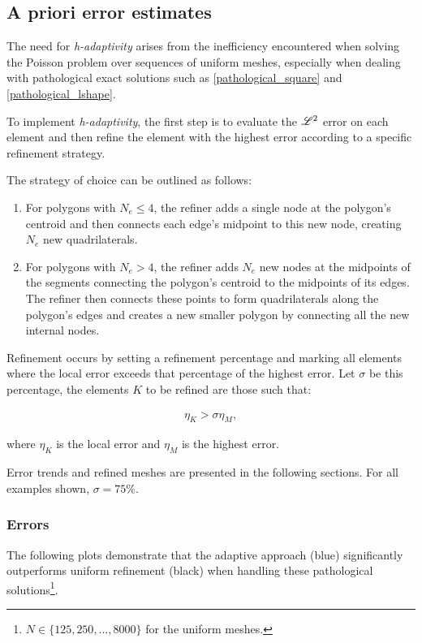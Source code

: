 \subsection{A priori error estimates}

The need for \textit{h-adaptivity} arises from the inefficiency encountered when solving the Poisson problem over sequences of uniform meshes, especially when dealing with pathological exact solutions such as \eqref{pathological_square} and \eqref{pathological_lshape}.

To implement \textit{h-adaptivity}, the first step is to evaluate the $\mathscr{L}^2$ error on each element and then refine the element with the highest error according to a specific refinement strategy.

The strategy of choice can be outlined as follows:

\begin{enumerate}
    \item For polygons with $N_e \leq 4$, the refiner adds a single node at the polygon's centroid and then connects each edge's midpoint to this new node, creating $N_e$ new quadrilaterals.
    \item For polygons with $N_e > 4$, the refiner adds $N_e$ new nodes at the midpoints of the segments connecting the polygon's centroid to the midpoints of its edges. The refiner then connects these points to form quadrilaterals along the polygon's edges and creates a new smaller polygon by connecting all the new internal nodes.
\end{enumerate}

Refinement occurs by setting a refinement percentage and marking all elements where the local error exceeds that percentage of the highest error. Let $\sigma$ be this percentage, the elements $K$ to be refined are those such that:

\begin{gather}
	\eta_K > \sigma \eta_{M},
\end{gather}

where $\eta_K$ is the local error and $\eta_M$ is the highest error.

Error trends and refined meshes are presented in the following sections. For all examples shown, $\sigma = 75\%$.

\newpage
\subsubsection{Errors}

The following plots demonstrate that the adaptive approach (blue) significantly outperforms uniform refinement (black) when handling these pathological solutions\footnote{$N \in \{125, 250, \dots, 8000\}$ for the uniform meshes.}.

